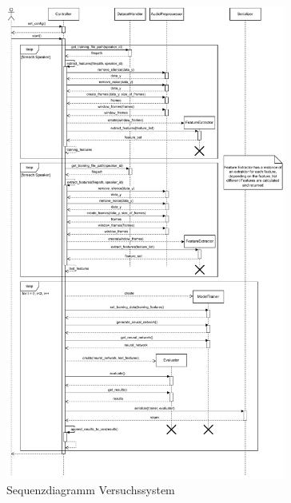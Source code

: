 \begin{figure}[H]
    \centering
    \includegraphics[width=0.82\textwidth, keepaspectratio]{images/versuchssytem_sequenzdiagramm.pdf}
    \caption{Sequenzdiagramm Versuchssystem}
    \label{fig:sequenzdiagramm-versuchssystem}
\end{figure}\noindent



